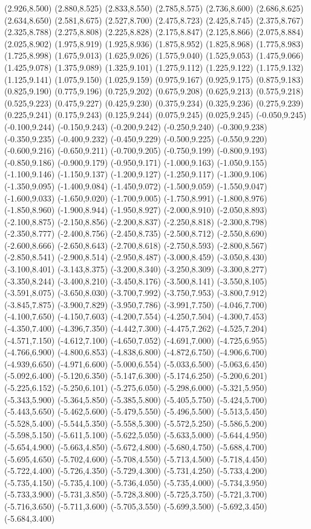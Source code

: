 (2.926,8.500) (2.880,8.525) (2.833,8.550) (2.785,8.575) (2.736,8.600) (2.686,8.625) (2.634,8.650) (2.581,8.675) (2.527,8.700) (2.475,8.723) (2.425,8.745) (2.375,8.767) (2.325,8.788) (2.275,8.808) (2.225,8.828) (2.175,8.847) (2.125,8.866) (2.075,8.884) (2.025,8.902) (1.975,8.919) (1.925,8.936) (1.875,8.952) (1.825,8.968) (1.775,8.983) (1.725,8.998) (1.675,9.013) (1.625,9.026) (1.575,9.040) (1.525,9.053) (1.475,9.066) (1.425,9.078) (1.375,9.089) (1.325,9.101) (1.275,9.112) (1.225,9.122) (1.175,9.132) (1.125,9.141) (1.075,9.150) (1.025,9.159) (0.975,9.167) (0.925,9.175) (0.875,9.183) (0.825,9.190) (0.775,9.196) (0.725,9.202) (0.675,9.208) (0.625,9.213) (0.575,9.218) (0.525,9.223) (0.475,9.227) (0.425,9.230) (0.375,9.234) (0.325,9.236) (0.275,9.239) (0.225,9.241) (0.175,9.243) (0.125,9.244) (0.075,9.245) (0.025,9.245) (-0.050,9.245) (-0.100,9.244) (-0.150,9.243) (-0.200,9.242) (-0.250,9.240) (-0.300,9.238) (-0.350,9.235) (-0.400,9.232) (-0.450,9.229) (-0.500,9.225) (-0.550,9.220) (-0.600,9.216) (-0.650,9.211) (-0.700,9.205) (-0.750,9.199) (-0.800,9.193) (-0.850,9.186) (-0.900,9.179) (-0.950,9.171) (-1.000,9.163) (-1.050,9.155) (-1.100,9.146) (-1.150,9.137) (-1.200,9.127) (-1.250,9.117) (-1.300,9.106) (-1.350,9.095) (-1.400,9.084) (-1.450,9.072) (-1.500,9.059) (-1.550,9.047) (-1.600,9.033) (-1.650,9.020) (-1.700,9.005) (-1.750,8.991) (-1.800,8.976) (-1.850,8.960) (-1.900,8.944) (-1.950,8.927) (-2.000,8.910) (-2.050,8.893) (-2.100,8.875) (-2.150,8.856) (-2.200,8.837) (-2.250,8.818) (-2.300,8.798) (-2.350,8.777) (-2.400,8.756) (-2.450,8.735) (-2.500,8.712) (-2.550,8.690) (-2.600,8.666) (-2.650,8.643) (-2.700,8.618) (-2.750,8.593) (-2.800,8.567) (-2.850,8.541) (-2.900,8.514) (-2.950,8.487) (-3.000,8.459) (-3.050,8.430) (-3.100,8.401) (-3.143,8.375) (-3.200,8.340) (-3.250,8.309) (-3.300,8.277) (-3.350,8.244) (-3.400,8.210) (-3.450,8.176) (-3.500,8.141) (-3.550,8.105) (-3.591,8.075) (-3.650,8.030) (-3.700,7.992) (-3.750,7.953) (-3.800,7.912) (-3.845,7.875) (-3.900,7.829) (-3.950,7.786) (-3.991,7.750) (-4.046,7.700) (-4.100,7.650) (-4.150,7.603) (-4.200,7.554) (-4.250,7.504) (-4.300,7.453) (-4.350,7.400) (-4.396,7.350) (-4.442,7.300) (-4.475,7.262) (-4.525,7.204) (-4.571,7.150) (-4.612,7.100) (-4.650,7.052) (-4.691,7.000) (-4.725,6.955) (-4.766,6.900) (-4.800,6.853) (-4.838,6.800) (-4.872,6.750) (-4.906,6.700) (-4.939,6.650) (-4.971,6.600) (-5.000,6.554) (-5.033,6.500) (-5.063,6.450) (-5.092,6.400) (-5.120,6.350) (-5.147,6.300) (-5.174,6.250) (-5.200,6.201) (-5.225,6.152) (-5.250,6.101) (-5.275,6.050) (-5.298,6.000) (-5.321,5.950) (-5.343,5.900) (-5.364,5.850) (-5.385,5.800) (-5.405,5.750) (-5.424,5.700) (-5.443,5.650) (-5.462,5.600) (-5.479,5.550) (-5.496,5.500) (-5.513,5.450) (-5.528,5.400) (-5.544,5.350) (-5.558,5.300) (-5.572,5.250) (-5.586,5.200) (-5.598,5.150) (-5.611,5.100) (-5.622,5.050) (-5.633,5.000) (-5.644,4.950) (-5.654,4.900) (-5.663,4.850) (-5.672,4.800) (-5.680,4.750) (-5.688,4.700) (-5.695,4.650) (-5.702,4.600) (-5.708,4.550) (-5.713,4.500) (-5.718,4.450) (-5.722,4.400) (-5.726,4.350) (-5.729,4.300) (-5.731,4.250) (-5.733,4.200) (-5.735,4.150) (-5.735,4.100) (-5.736,4.050) (-5.735,4.000) (-5.734,3.950) (-5.733,3.900) (-5.731,3.850) (-5.728,3.800) (-5.725,3.750) (-5.721,3.700) (-5.716,3.650) (-5.711,3.600) (-5.705,3.550) (-5.699,3.500) (-5.692,3.450) (-5.684,3.400) 